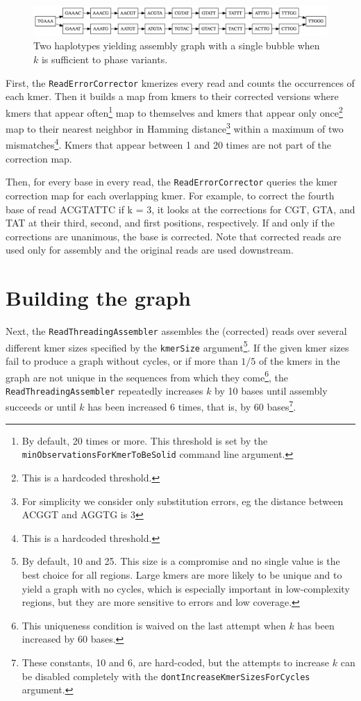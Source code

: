 \documentclass[nofootinbib,amssymb,amsmath]{revtex4}
\newcommand{\code}[1]{\texttt{#1}}
\begin{document}
\begin{figure}
\center
\includegraphics[scale=0.5]{phased_graph.png}
\caption{Two haplotypes yielding assembly graph with a single bubble when $k$ is sufficient to phase variants.}
\label{fig:phased}
\end{figure}

First, the \code{ReadErrorCorrector} kmerizes every read and counts the occurrences of each kmer.  Then it builds a map from kmers to their corrected versions where kmers that appear often\footnote{By default, 20 times or more.  This threshold is set by the \code{minObservationsForKmerToBeSolid} command line argument.} map to themselves and kmers that appear only once\footnote{This is a hardcoded threshold.} map to their nearest neighbor in Hamming distance\footnote{For simplicity we consider only substitution errors, eg the distance between ACGGT and AGGTG is 3} within a maximum of two mismatches\footnote{This is a hardcoded threshold.}.  Kmers that appear between 1 and 20 times are not part of the correction map.

Then, for every base in every read, the \code{ReadErrorCorrector} queries the kmer correction map for each overlapping kmer.  For example, to correct the fourth base of read ACGTATTC if k = 3, it looks at the corrections for CGT, GTA, and TAT at their third, second, and first positions, respectively.  If and only if the corrections are unanimous, the base is corrected.  Note that corrected reads are used only for assembly and the original reads are used downstream.

\section{Building the graph} \label{graph-assembly}
Next, the \code{ReadThreadingAssembler} assembles the (corrected) reads over several different kmer sizes specified by the \code{kmerSize} argument\footnote{By default, 10 and 25.  This size is a compromise and no single value is the best choice for all regions.  Large kmers are more likely to be unique and to yield a graph with no cycles, which is especially important in low-complexity regions, but they are more sensitive to errors and low coverage.}.  If the given kmer sizes fail to produce a graph without cycles, or if more than $1/5$ of the kmers in the graph are not unique in the sequences from which they come\footnote{This uniqueness condition is waived on the last attempt when $k$ has been increased by 60 bases.}, the \code{ReadThreadingAssembler} repeatedly increases $k$ by 10 bases until assembly succeeds or until $k$ has been increased 6 times, that is, by 60 bases\footnote{These constants, 10 and 6, are hard-coded, but the attempts to increase $k$ can be disabled completely with the \code{dontIncreaseKmerSizesForCycles} argument.}.
\end{document}
